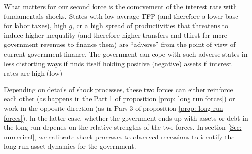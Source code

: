 \documentclass[thmsb,11pt]{article}
\begin{document}
{ What matters for our second force is the comovement of the interest rate with fundamentals shocks. States with low average TFP (and therefore a lower base for labor taxes), high $g$, or a high spread of productivities that threatens to induce higher inequality (and therefore higher  transfers and thirst for more  government  revenues to finance them) are ``adverse'' from the point of view of current government finance.
 The government can cope with such adverse states in less distorting ways if finds itself holding positive (negative) assets if interest rates are  high (low).


Depending on  details of shock processes, these two forces can
either reinforce each other (as happens in the Part 1 %
 of  proposition \ref{prop: long run forces}) or work in the opposite direction (as in Part 3 of  proposition \ref{prop: long run forces}). In the latter case, whether the
government ends up with assets or debt in the long run depends on the
relative strengths of the two forces. In section \ref{Sec: numerical},  we
calibrate shock processes to observed recessions to identify the long run asset
dynamics for the government.

}
\end{document}
